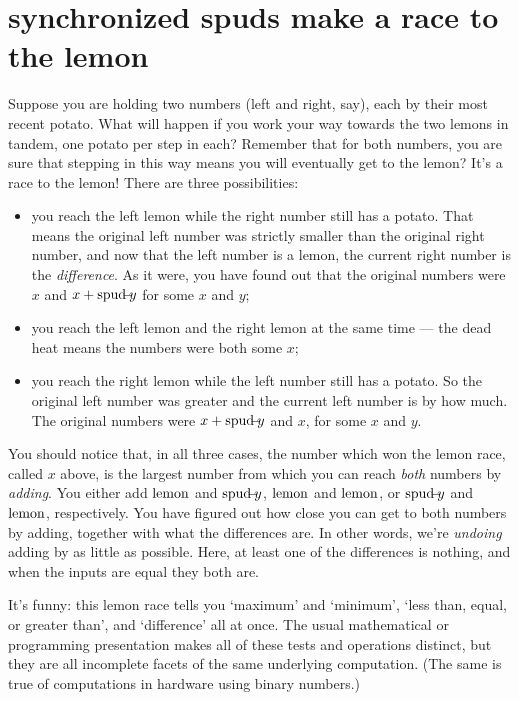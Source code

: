 \documentclass{book}
\begin{document}
\section{synchronized spuds make a race to the lemon}

Suppose you are holding two numbers (left and right, say), each by their most recent potato. What will happen if you work your way towards the two lemons in tandem, one potato per step in each? Remember that for both numbers, you are sure that stepping in this way means you will eventually get to the lemon? It's a race to the lemon! There are three possibilities:
\begin{itemize}
\item you reach the left lemon while the right number still has a potato. That means the original left number was strictly smaller than the original right number, and now that the left number is a lemon, the current right number is the \emph{difference}. As it were, you have found out that the original numbers were $x$ and $x+\mbox{spud}\!\!\!-\!\!\! y$ for some $x$ and $y$;
\item you reach the left lemon and the right lemon at the same time --- the dead heat means the numbers were both some $x$;
\item you reach the right lemon while the left number still has a potato. So the original left number was greater and the current left number is by how much. The original numbers were $x+\mbox{spud}\!\!\!-\!\!\! y$ and $x$, for some $x$ and $y$.
\end{itemize}

You should notice that, in all three cases, the number which won the lemon race, called $x$ above, is the largest number from which you can reach \emph{both} numbers by \emph{adding}. You either add $\mbox{lemon}$ and $\mbox{spud}\!\!\!-\!\!\! y$, $\mbox{lemon}$ and $\mbox{lemon}$, or $\mbox{spud}\!\!\!-\!\!\! y$ and $\mbox{lemon}$, respectively. You have figured out how close you can get to both numbers by adding, together with what the differences are. In other words, we're \emph{undoing} adding by as little as possible. Here, at least one of the differences is nothing, and when the inputs are equal they both are.

It's funny: this lemon race tells you `maximum' and `minimum', `less than, equal, or greater than', and `difference' all at once. The usual mathematical or programming presentation makes all of these tests and operations distinct, but they are all incomplete facets of the same underlying computation. (The same is true of computations in hardware using binary numbers.)
\end{document}

